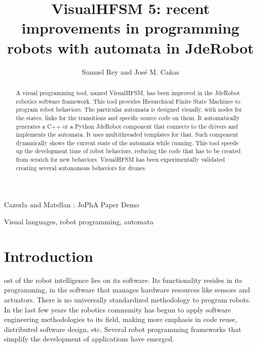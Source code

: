 \documentclass[journal,twoside]{JoPhA}
\begin{document}
\title{VisualHFSM 5: recent improvements in programming robots with automata in JdeRobot}
 
\author{Samuel Rey and Jos\'e M. Ca\~nas
}

%
{Cazorla and Matellan : JoPhA Paper Demo}
\maketitle


\begin{abstract}
A visual programming tool, named VisualHFSM, has been improved in the JdeRobot robotics software framework. This tool provides Hierarchical Finite State Machines to program robot behaviors. The particular automata is designed visually, with nodes for the states, links for the transitions and specific source code on them. It automatically generates a C++ or a Python JdeRobot component that connects to the drivers and implements the automata. It uses multithreaded templates for that. Such component dynamically shows the current state of the automata while running. This tool speeds up the development time of robot behaviors, reducing the code that has to be created from scratch for new behaviors. VisualHFSM has been experimentally validated creating several autonomous behaviors for drones.
\end{abstract}


\begin{IEEEkeywords}
Visual languages, robot programming, automata
\end{IEEEkeywords}


\section{Introduction}

ost of the robot intelligence lies on its software. Its functionality resides in its programming, in the software that manages hardware resources like sensors and actuators. There is no universally standardized methodology to program robots. In the last few years the robotics community has begun to apply software engineering methodologies to its field, making more emphasis in code reuse, distributed software design, etc. Several robot programming frameworks that simplify the development of applications have emerged. 
\end{document}
